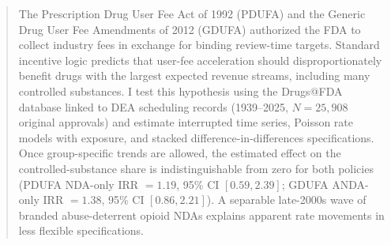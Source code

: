 \begin{abstract}

The Prescription Drug User Fee Act of 1992 (PDUFA) and the Generic Drug User Fee Amendments of 2012 (GDUFA) authorized the FDA to collect industry fees in exchange for binding review-time targets. Standard incentive logic predicts that user-fee acceleration should disproportionately benefit drugs with the largest expected revenue streams, including many controlled substances. I test this hypothesis using the Drugs@FDA database linked to DEA scheduling records (1939--2025, $N = 25{,}908$ original approvals) and estimate interrupted time series, Poisson rate models with exposure, and stacked difference-in-differences specifications. Once group-specific trends are allowed, the estimated effect on the controlled-substance share is indistinguishable from zero for both policies (PDUFA NDA-only IRR $= 1.19$, 95\% CI $[0.59, 2.39]$; GDUFA ANDA-only IRR $= 1.38$, 95\% CI $[0.86, 2.21]$). A separable late-2000s wave of branded abuse-deterrent opioid NDAs explains apparent rate movements in less flexible specifications.

\end{abstract}
